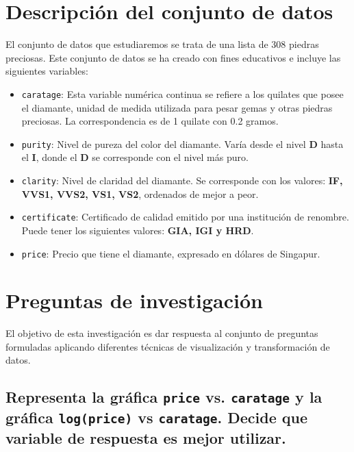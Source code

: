 \documentclass[a4paper, 7pt]{article}
\begin{document}



\section{Descripción del conjunto de datos}
\label{sec:descripcion-datos}
\noindent

El conjunto de datos que estudiaremos se trata de una lista de 308 piedras preciosas. Este conjunto de datos se ha creado con fines educativos e incluye las siguientes variables:

\begin{itemize}
    \item \texttt{caratage}: Esta variable numérica continua se refiere a los quilates que posee el diamante, unidad de medida utilizada para pesar gemas y otras piedras preciosas. La correspondencia es de 1 quilate con 0.2 gramos.
    \item \texttt{purity}: Nivel de pureza del color del diamante. Varía desde el nivel \textbf{D} hasta el \textbf{I}, donde el \textbf{D} se corresponde con el nivel más puro.
    \item \texttt{clarity}: Nivel de claridad del diamante. Se corresponde con los valores: \textbf{IF, VVS1, VVS2, VS1, VS2}, ordenados de mejor a peor.
    \item \texttt{certificate}: Certificado de calidad emitido por una institución de renombre. Puede tener los siguientes valores: \textbf{GIA, IGI y HRD}.
    \item \texttt{price}: Precio que tiene el diamante, expresado en dólares de Singapur.
\end{itemize}

\section{Preguntas de investigación}
\noindent
El objetivo de esta investigación es dar respuesta al conjunto de preguntas formuladas aplicando diferentes técnicas de visualización y transformación de datos.

\subsection{Representa la gráfica \texttt{price} vs. \texttt{caratage} y la gráfica \texttt{log(price)} vs \texttt{caratage}. Decide que variable de respuesta es mejor utilizar.}
\label{subsec:question-1}
\end{document}
